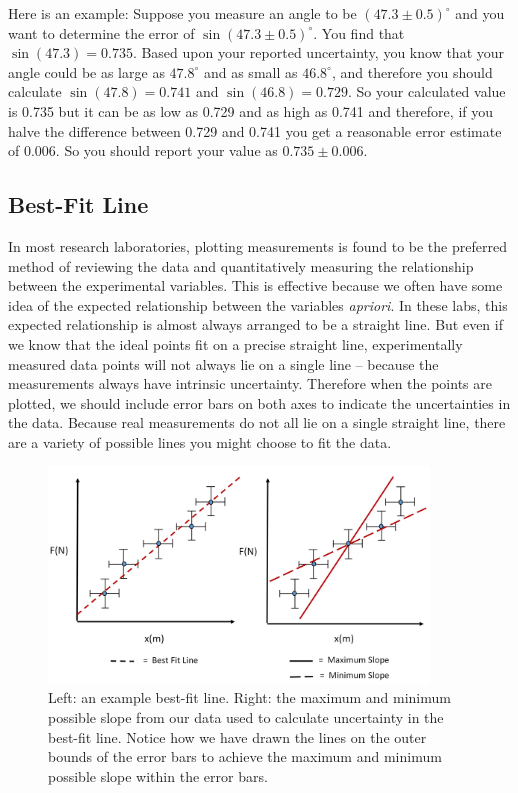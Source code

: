 Here is an example: Suppose you measure an angle to be $(47.3 \pm 0.5)^\circ$ and you want to determine the error of $\sin(47.3 \pm 0.5)^\circ$. You find that $\sin(47.3) = 0.735$. Based upon your reported uncertainty, you know that your angle could be as large as $47.8^\circ$ and as small as $46.8^\circ$, and therefore you should calculate $\sin(47.8) = 0.741$ and $\sin(46.8) = 0.729$. So your calculated value is 0.735 but it can be as low as 0.729 and as high as 0.741 and therefore, if you halve the difference between 0.729 and 0.741 you get a reasonable error estimate of 0.006. So you should report your value as $0.735 \pm 0.006$.

\subsection{Best-Fit Line}

In most research laboratories, plotting measurements is found to be the preferred method of reviewing the data and quantitatively measuring the relationship between the experimental variables. This is effective because we often have some idea of the expected relationship between the variables {\it{apriori}}. In these labs, this expected relationship is almost always arranged to be a straight line. But even if we know that the ideal points fit on a precise straight line, experimentally measured data points will not always lie on a single line -- because the measurements always have intrinsic uncertainty. Therefore when the points are plotted, we should include error bars on both axes to indicate the uncertainties in the data. Because real measurements do not all lie on a single straight line, there are a variety of possible lines you might choose to fit the data. \myskip

\begin{figure}[h]
    \begin{center}
        \includegraphics[width=0.9\textwidth, height=0.5\textwidth]{./Exp3/pic/image13.jpg}
    \end{center}
    \caption{Left: an example best-fit line. Right: the maximum and minimum possible slope from our data used to calculate uncertainty in the best-fit line. Notice how we have drawn the lines on the outer bounds of the error bars to achieve the maximum and minimum possible slope within the error bars.}
    \label{fig:bestfit}
\end{figure}


